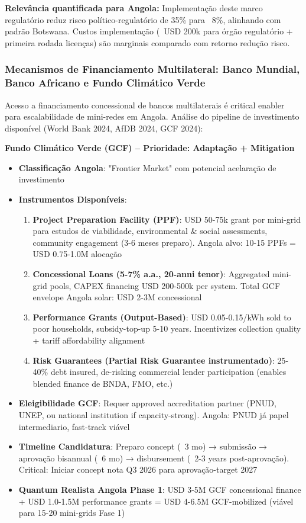 \documentclass[12pt, a4paper]{article}
\begin{document}
{{{{{{{{{{{{{\textbf{Relevância quantificada para Angola:} Implementação deste marco regulatório reduz risco político-regulatório de 35\% para ~8\%, alinhando com padrão Botswana. Custos implementação (~USD 200k para órgão regulatório + primeira rodada licenças) são marginais comparado com retorno redução risco.

\subsubsection{Mecanismos de Financiamento Multilateral: Banco Mundial, Banco Africano e Fundo Climático Verde}

Acesso a financiamento concessional de bancos multilaterais é critical enabler para escalabilidade de mini-redes em Angola. Análise do pipeline de investimento disponível (World Bank 2024, AfDB 2024, GCF 2024):

\textbf{Fundo Climático Verde (GCF) – Prioridade: Adaptação + Mitigation}
\begin{itemize}
\item \textbf{Classificação Angola}: "Frontier Market" com potencial acelaração de investimento
\item \textbf{Instrumentos Disponíveis}:
  \begin{enumerate}
  \item \textbf{Project Preparation Facility (PPF)}: USD 50-75k grant por mini-grid para estudos de viabilidade, environmental & social assessments, community engagement (3-6 meses preparo). Angola alvo: 10-15 PPFs = USD 0.75-1.0M alocação
  \item \textbf{Concessional Loans (5-7\% a.a., 20-anni tenor)}: Aggregated mini-grid pools, CAPEX financing USD 200-500k per system. Total GCF envelope Angola solar: USD 2-3M concessional
  \item \textbf{Performance Grants (Output-Based)}: USD 0.05-0.15/kWh sold to poor households, subsidy-top-up 5-10 years. Incentivizes collection quality + tariff affordability alignment
  \item \textbf{Risk Guarantees (Partial Risk Guarantee instrumentado)}: 25-40\% debt insured, de-risking commercial lender participation (enables blended finance de BNDA, FMO, etc.)
  \end{enumerate}
\item \textbf{Eleigibilidade GCF}: Requer approved accreditation partner (PNUD, UNEP, ou national institution if capacity-strong). Angola: PNUD já papel intermediario, fast-track viável
\item \textbf{Timeline Candidatura}: Preparo concept (~3 mo) → submissão → aprovação bisannual (~6 mo) → disbursement (~2-3 years post-aprovação). Critical: Iniciar concept nota Q3 2026 para aprovação-target 2027
\item \textbf{Quantum Realista Angola Phase 1}: USD 3-5M GCF concessional finance + USD 1.0-1.5M performance grants = USD 4-6.5M GCF-mobilized (viável para 15-20 mini-grids Fase 1)
\end{itemize}

}}}}}}}}}}}}}
\end{document}
